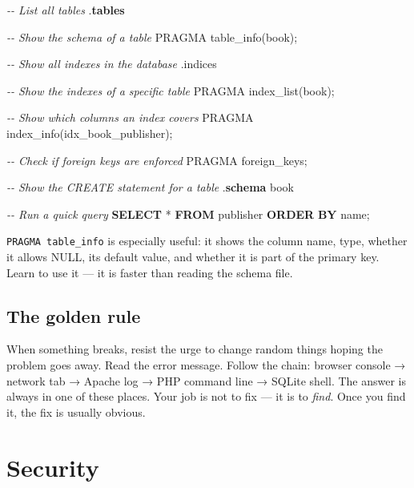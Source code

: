 \documentclass[11pt,a4paper,oneside]{book}
\newenvironment{Shaded}{\begin{snugshade}}{\end{snugshade}}
\newcommand{\KeywordTok}[1]{\textcolor[HTML]{007020}{\textbf{#1}}}
\newcommand{\CommentTok}[1]{\textcolor[HTML]{60A0B0}{\textit{#1}}}
\newcommand{\OperatorTok}[1]{\textcolor[HTML]{666666}{#1}}
\newcommand{\NormalTok}[1]{#1}
\begin{document}
\begin{Shaded}
\begin{Highlighting}[]
\CommentTok{{-}{-} List all tables}
\NormalTok{.}\KeywordTok{tables}

\CommentTok{{-}{-} Show the schema of a table}
\NormalTok{PRAGMA table\_info(book);}

\CommentTok{{-}{-} Show all indexes in the database}
\NormalTok{.indices}

\CommentTok{{-}{-} Show the indexes of a specific table}
\NormalTok{PRAGMA index\_list(book);}

\CommentTok{{-}{-} Show which columns an index covers}
\NormalTok{PRAGMA index\_info(idx\_book\_publisher);}

\CommentTok{{-}{-} Check if foreign keys are enforced}
\NormalTok{PRAGMA foreign\_keys;}

\CommentTok{{-}{-} Show the CREATE statement for a table}
\NormalTok{.}\KeywordTok{schema}\NormalTok{ book}

\CommentTok{{-}{-} Run a quick query}
\KeywordTok{SELECT} \OperatorTok{*} \KeywordTok{FROM}\NormalTok{ publisher }\KeywordTok{ORDER} \KeywordTok{BY}\NormalTok{ name;}
\end{Highlighting}
\end{Shaded}

\texttt{PRAGMA\ table\_info} is especially useful: it shows the
column name, type, whether it allows NULL, its default value, and
whether it is part of the primary key. Learn to use it --- it is
faster than reading the schema file.

\hypertarget{the-golden-rule}{%
\section{The golden rule}\label{the-golden-rule}}

When something breaks, resist the urge to change random things
hoping the problem goes away. Read the error message. Follow the
chain: browser console → network tab → Apache log → PHP command
line → SQLite shell. The answer is always in one of these places.
Your job is not to fix --- it is to \emph{find}. Once you find
it, the fix is usually obvious.

\newpage

\hypertarget{security}{%
\chapter{Security}\label{security}}
\end{document}
